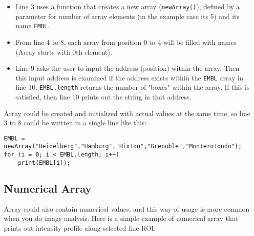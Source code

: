 \documentclass[11pt,a4paper,oneside]{report}
\newcommand{\ilcom}[1]{\texttt{\small#1}}
\begin{document}
\begin{itemize}
\item Line 3 uses a function that creates a new array (\ilcom{newArray()}),
defined by a parameter for number of array elements (in the example case its 5) and its name \ilcom{EMBL}.
\item From line 4 to 8, each array from position 0 to 4 will be filled with
names (Array starts with 0th element).
\item Line 9 asks the user to input the address (position) within the array.
Then this input address is examined if the address exists within the
\ilcom{EMBL} array in line 10. \ilcom{EMBL.length} returns the number of "boxes"
within the array. If this is satisfied, then line 10 prints out the string in that address.
\end{itemize}

Array could be created and initialized with actual values at the
same time, so line 3 to 8 could be written in a single line like this: 
\begin{lstlisting}[numbers=none]
EMBL = newArray("Heidelberg","Hamburg","Hixton","Grenoble","Monterotondo");
for (i = 0; i < EMBL.length; i++)
	print(EMBL[i]);
\end{lstlisting}

\subsection{Numerical Array}

Array could also contain numerical values, and this way of usage is more common when you do image analysis. Here is a simple example of numerical array that prints out intensity profile along selected line ROI. 


\end{document}
